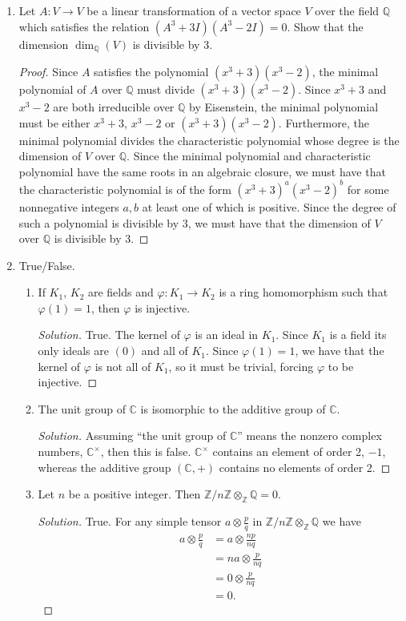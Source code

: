 \documentclass[11pt,letterpaper]{report}
\newcommand{\integers}{\mathbb{Z}}
\newcommand{\complex}{\mathbb{C}}
\newcommand{\rationals}{\mathbb{Q}}
\newenvironment{solution}
{\begin{proof}[Solution]}
{\end{proof}}
\begin{document}
\begin{enumerate}
\begin{enumerate}
\begin{solution}
		\end{solution}
	\end{enumerate}
	\item Let $A: V\to V$ be a linear transformation of a vector space $V$ over the field $\rationals$ which satisfies the relation $(A^3+3I)(A^3-2I)=0$. Show that the dimension $\dim_\rationals(V)$ is divisible by 3.
	\begin{proof}
		Since $A$ satisfies the polynomial $(x^3+3)(x^3-2)$, the minimal polynomial of $A$ over $\rationals$ must divide $(x^3+3)(x^3-2)$. Since $x^3+3$ and $x^3-2$ are both irreducible over $\rationals$ by Eisenstein, the minimal polynomial must be either $x^3+3$, $x^3-2$ or $(x^3+3)(x^3-2)$. Furthermore, the minimal polynomial divides the characteristic polynomial whose degree is the dimension of $V$ over $\rationals$. Since the minimal polynomial and characteristic polynomial have the same roots in an algebraic closure, we must have that the characteristic polynomial is of the form $(x^3+3)^a(x^3-2)^b$ for some nonnegative integers $a,b$ at least one of which is positive. Since the degree of such a polynomial is divisible by 3, we must have that the dimension of $V$ over $\rationals$ is divisible by 3.
	\end{proof}

	\item True/False.
	\begin{enumerate}
		\item If $K_1$, $K_2$ are fields and $\varphi: K_1\to K_2$ is a ring homomorphism such that $\varphi(1)=1$, then $\varphi$ is injective.
		\begin{solution}
			True. The kernel of $\varphi$ is an ideal in $K_1$. Since $K_1$ is a field its only ideals are $(0)$ and all of $K_1$. Since $\varphi(1) = 1$, we have that the kernel of $\varphi$ is not all of $K_1$, so it must be trivial, forcing $\varphi$ to be injective.
		\end{solution}
		\item The unit group of $\complex$ is isomorphic to the additive group of $\complex$.
		\begin{solution}
			Assuming ``the unit group of $\complex$'' means the nonzero complex numbers, $\complex^\times$, then this is false. $\complex^\times$ contains an element of order 2, $-1$, whereas the additive group $(\complex, +)$ contains no elements of order 2.
		\end{solution}
		\item Let $n$ be a positive integer. Then $\integers/n\integers\otimes_\integers\rationals = 0$.
		\begin{solution}
			True. For any simple tensor $a\otimes \frac{p}{q}$ in $\integers/n\integers\otimes_\integers \rationals$ we have
			\begin{align*}
				a\otimes \frac{p}{q} &= a\otimes \frac{np}{nq}\\
				&= na\otimes \frac{p}{nq}\\
				&= 0\otimes \frac{p}{nq}\\
				&= 0.
			\end{align*}
		\end{solution}
	\end{enumerate}


\end{enumerate}
\end{document}
